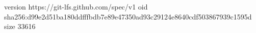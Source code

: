 version https://git-lfs.github.com/spec/v1
oid sha256:d99e2d51ba180ddfffbdb7e89e47350ad93c29124e8640cdf503867939c1595d
size 33616
